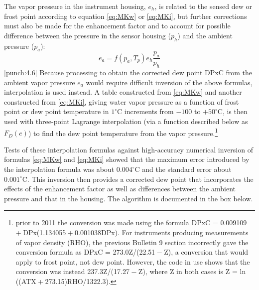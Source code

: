 \documentclass[
  english,
]{book}
\begin{document}
The vapor pressure in the instrument housing, \(e_h\), is related to the sensed dew or frost point according to equation \eqref{eq:MKw} or \eqref{eq:MKi}, but further corrections must also be made for the enhancement factor and to account for possible difference between the pressure in the sensor housing (\(p_h\)) and the ambient pressure (\(p_a\)):\\
\begin{equation}
e_{a}=f(p_{a},T_{p})e_{h}\frac{p_{a}}{p_{h}}
\label{eq:housingCorr}
\end{equation}
\protect\hypertarget{punch:4.6}{}{{[}punch:4.6{]}}
Because processing to obtain the corrected dew point DPxC from the ambient vapor pressure \(e_a\) would require difficult inversion of the above formulas, interpolation is used instead. A table constructed from \eqref{eq:MKw} and another constructed from \eqref{eq:MKi}, giving water vapor pressure as a function of frost point or dew point temperature in \(1^\circ\mathrm{C}\) increments from \(-100\) to \(+50^\circ\mathrm{C}\), is then used with three-point Lagrange interpolation (via a function described below as \(F_D(e)\)) to find the dew point temperature from the vapor pressure.\footnote{prior to 2011 the conversion was made using the formula {DPxC = 0.009109 + DPx(1.134055 + 0.001038DPx)}. For instruments producing measurements of vapor density (RHO), the previous Bulletin 9 section incorrectly gave the conversion formula as {DPxC = 273.0Z/(22.51 − Z)}, a conversion that would apply to frost point, not dew point. However, the code in use shows that the conversion was instead {237.3Z/(17.27 − Z)}, where Z in both cases is {Z = ln ((ATX + 273.15)RHO/1322.3)}.}

Tests of these interpolation formulas against high-accuracy numerical inversion of formulas \eqref{eq:MKw} and \eqref{eq:MKi} showed that the maximum error introduced by the interpolation formula was about \(0.004^\circ\mathrm{C}\) and the standard error about \(0.001^\circ\mathrm{C}\). This inversion then provides a corrected dew point that incorporates the effects of the enhancement factor as well as differences between the ambient pressure and that in the housing. The algorithm is documented in the box below.
\end{document}
